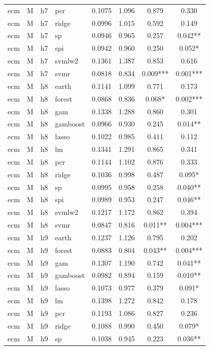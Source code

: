 \begin{ThreePartTable}
\begin{longtable}[t]{llclcccc}
ecm & M & h7 & pcr & 0.1075 & 1.096 & 0.879 & 0.330\\
ecm & M & h7 & ridge & 0.0996 & 1.015 & 0.592 & 0.149\\
ecm & M & h7 & sp & 0.0946 & 0.965 & 0.257 & 0.042**\\
ecm & M & h7 & spi & 0.0942 & 0.960 & 0.250 & 0.052*\\
ecm & M & h7 & svmlw2 & 0.1361 & 1.387 & 0.853 & 0.616\\
ecm & M & h7 & svmr & 0.0818 & 0.834 & 0.009*** & 0.001***\\
\addlinespace
ecm & M & h8 & earth & 0.1141 & 1.099 & 0.771 & 0.173\\
ecm & M & h8 & forest & 0.0868 & 0.836 & 0.068* & 0.002***\\
ecm & M & h8 & gam & 0.1338 & 1.288 & 0.860 & 0.301\\
ecm & M & h8 & gamboost & 0.0966 & 0.930 & 0.245 & 0.014**\\
ecm & M & h8 & lasso & 0.1022 & 0.985 & 0.411 & 0.112\\
ecm & M & h8 & lm & 0.1341 & 1.291 & 0.865 & 0.341\\
ecm & M & h8 & pcr & 0.1144 & 1.102 & 0.876 & 0.333\\
ecm & M & h8 & ridge & 0.1036 & 0.998 & 0.487 & 0.095*\\
ecm & M & h8 & sp & 0.0995 & 0.958 & 0.258 & 0.040**\\
ecm & M & h8 & spi & 0.0989 & 0.953 & 0.247 & 0.046**\\
ecm & M & h8 & svmlw2 & 0.1217 & 1.172 & 0.862 & 0.394\\
ecm & M & h8 & svmr & 0.0847 & 0.816 & 0.011** & 0.004***\\
\addlinespace
ecm & M & h9 & earth & 0.1237 & 1.126 & 0.795 & 0.202\\
ecm & M & h9 & forest & 0.0883 & 0.804 & 0.043** & 0.004***\\
ecm & M & h9 & gam & 0.1307 & 1.190 & 0.742 & 0.041**\\
ecm & M & h9 & gamboost & 0.0982 & 0.894 & 0.159 & 0.010**\\
ecm & M & h9 & lasso & 0.1073 & 0.977 & 0.379 & 0.091*\\
ecm & M & h9 & lm & 0.1398 & 1.272 & 0.842 & 0.178\\
ecm & M & h9 & pcr & 0.1193 & 1.086 & 0.827 & 0.236\\
ecm & M & h9 & ridge & 0.1088 & 0.990 & 0.450 & 0.079*\\
ecm & M & h9 & sp & 0.1038 & 0.945 & 0.223 & 0.036**\\

\end{longtable}
\end{ThreePartTable}

